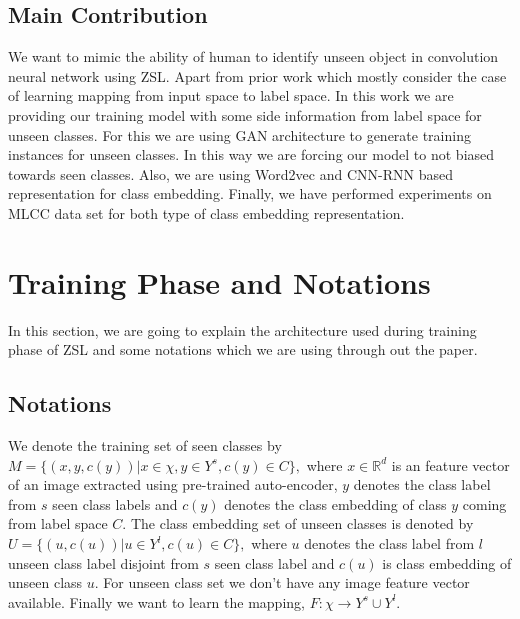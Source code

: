 \documentclass[11pt, conference, english]{IEEEtran}
\theoremstyle{plain}
\theoremstyle{definition}
\theoremstyle{remark}
\begin{document}
	\subsection{Main Contribution}
	We want to mimic the ability of human to identify unseen object in convolution neural network using ZSL. Apart from prior work which mostly consider the case of learning mapping from input space to label space. In this work we are providing our training model with some side information from label space for unseen classes. For this we are using GAN architecture to generate training instances for unseen classes. In this way we are forcing our model to not biased towards seen classes. Also, we are using Word2vec and CNN-RNN based representation for class embedding. Finally, we have performed experiments on MLCC data set for both type of class embedding representation.
	\section{Training Phase and Notations}
	In this section, we are going to explain the architecture used during training phase of ZSL and some notations which we are using through out the paper. 
	\subsection{Notations}
	We denote the training set of seen classes by $M=\{(x,y,c(y))|x\in \chi, y \in Y^{s}, c(y) \in C \},$
	where $x\in \mathbb{R}^{d}$ is an feature vector of an image extracted using pre-trained auto-encoder, $y$ denotes the class label from $s$ seen class labels and $c(y)$ denotes the class embedding of class $y$ coming from label space $C$. The class embedding set of unseen classes is denoted by $U=\{(u,c(u))|u \in Y^l,c(u)\in C\},$ where $u$ denotes the class label  from $l$ unseen class label disjoint from $s$ seen class label and $c(u)$ is class embedding of unseen class $u$. For unseen class set we don't have any image feature vector available. Finally we want to learn the mapping,
	$F:\chi \rightarrow Y^s \cup Y^l$.
	 
\end{document}
